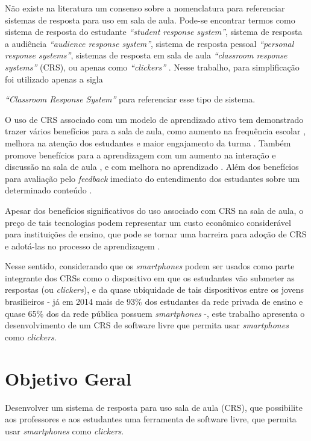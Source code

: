 Não existe na literatura um consenso sobre a nomenclatura para referenciar sistemas de
resposta para uso em sala de aula. Pode-se encontrar termos como
sistema de resposta do estudante \textit{``student response system''},
sistema de resposta a audiência \textit{``audience response system''},
sistema de resposta pessoal \textit{``personal response systems''},
sistemas de resposta em sala de aula {\textit{``classroom response systems''} (CRS)},
ou apenas como \textit{``clickers''} \cite{Hunsu2016}.
Nesse trabalho, para simplificação foi utilizado apenas a sigla {\clicker} {\textit{``Classroom Response System''}
para referenciar esse tipo de sistema.

O uso de CRS associado com um modelo de aprendizado ativo tem demonstrado
trazer vários benefícios para a sala de aula, como aumento na frequência escolar \cite{Fotaris2016},
melhora na atenção dos estudantes \cite{Terrion2012} e maior engajamento da turma \cite{Kaya2016}.
Também promove benefícios para a aprendizagem com um aumento na interação e discussão na sala de aula \cite{Mattos2015, Barragues2011},
e com melhora no aprendizado \cite{sun2014, Hunsu2016}. Além dos
benefícios para avaliação pelo \textit{feedback} imediato do entendimento dos estudantes
sobre um determinado conteúdo  \cite{Rana2016, Blood2013}.

Apesar dos benefícios significativos do uso associado com CRS na sala de aula,
o preço de tais tecnologias podem representar um custo econômico considerável
para instituições de ensino, que pode se tornar uma barreira para adoção de CRS e
adotá-las no processo de aprendizagem \cite{Blasco-Arcas2013}.

Nesse sentido, considerando que os \textit{smartphones} podem ser usados
como parte integrante dos CRSs como o dispositivo em que os estudantes vão submeter as respostas (ou \textit{clickers}),
e da quase ubiquidade de tais dispositivos entre os jovens brasilieiros - já em 2014 mais de 93\% dos estudantes da rede
privada de ensino e quase 65\% dos da rede pública possuem \textit{smartphones} \cite[p. 55]{IBGE2016} -,
este trabalho apresenta o desenvolvimento de um CRS de software livre que permita usar
{\textit{smartphones}} como \textit{clickers}.

\section{Objetivo Geral}
Desenvolver um sistema de resposta para uso sala de aula (CRS),
que possibilite aos professores e aos estudantes uma ferramenta de software livre,
que permita usar {\textit{smartphones}} como \textit{clickers}.

}

